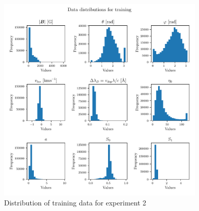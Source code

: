 \documentclass[a4paper,12pt]{report}
\begin{document}
\begin{figure}[h!]
\centering
\includegraphics[width=10cm]{figures/nf-milne-eddington-example-6-datadistributiontraining-nflows-piecewisequadratic.pdf}
\caption{Distribution of training data for experiment 2}
\label{fig:nf-milne-eddington-example-6-datadistributiontraining-nflows-piecewisequadratic}
\end{figure}
\end{document}
